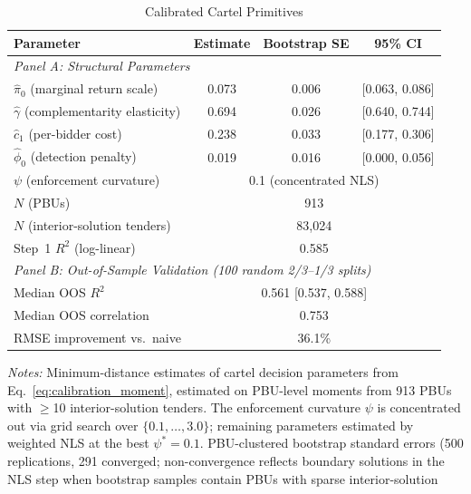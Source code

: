 \begin{table}[!htbp]
\centering
\caption{Calibrated Cartel Primitives}
\label{tab:cartel_primitives}
\begin{threeparttable}
\small
\begin{tabular}{lccc}
\toprule
Parameter & Estimate & Bootstrap SE & 95\% CI \\
\midrule
\multicolumn{4}{l}{\textit{Panel A: Structural Parameters}} \\[3pt]
$\hat{\pi}_0$ (marginal return scale) & 0.073 & 0.006 & [0.063, 0.086] \\
$\hat{\gamma}$ (complementarity elasticity) & 0.694 & 0.026 & [0.640, 0.744] \\
$\hat{c}_1$ (per-bidder cost) & 0.238 & 0.033 & [0.177, 0.306] \\
$\hat{\phi}_0$ (detection penalty) & 0.019 & 0.016 & [0.000, 0.056] \\
$\psi$ (enforcement curvature) & \multicolumn{3}{c}{0.1 (concentrated NLS)} \\[3pt]
$N$ (PBUs) & \multicolumn{3}{c}{913} \\
$N$ (interior-solution tenders) & \multicolumn{3}{c}{83,024} \\
Step~1 $R^2$ (log-linear) & \multicolumn{3}{c}{0.585} \\
\midrule
\multicolumn{4}{l}{\textit{Panel B: Out-of-Sample Validation (100 random 2/3--1/3 splits)}} \\[3pt]
Median OOS $R^2$ & \multicolumn{3}{c}{0.561 [0.537, 0.588]} \\
Median OOS correlation & \multicolumn{3}{c}{0.753} \\
RMSE improvement vs.\ naive & \multicolumn{3}{c}{36.1\%} \\
\bottomrule
\end{tabular}
\begin{tablenotes}
\small
\item \textit{Notes:} Minimum-distance estimates of cartel decision
parameters from Eq.~\eqref{eq:calibration_moment}, estimated on
PBU-level moments from 913 PBUs with $\geq$10 interior-solution
tenders. The enforcement curvature $\psi$ is concentrated out via
grid search over $\{0.1, \ldots, 3.0\}$; remaining parameters
estimated by weighted NLS at the best $\psi^* = 0.1$.
PBU-clustered bootstrap standard errors (500 replications, 291
converged; non-convergence reflects boundary solutions in the NLS
step when bootstrap samples contain PBUs with sparse interior-solution

\end{tablenotes}
\end{threeparttable}
\end{table}
